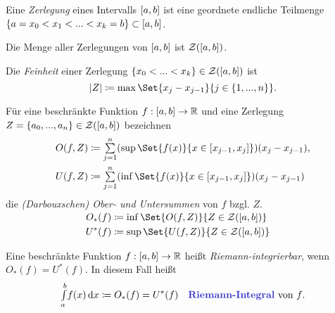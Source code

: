 \documentclass{cheat-sheet}
\theoremstyle{definition}
\begin{document}
\begin{defn}
  Eine \emph{Zerlegung} eines Intervalls $\left[ a, b \right]$ ist eine geordnete endliche Teilmenge $\{ a = x_0 < x_1 < ... < x_k = b\} \subset \left[ a, b \right]$.
\end{defn}

\begin{nota}
  Die Menge aller Zerlegungen von $\left[ a, b \right]$ ist $\mathcal{Z}(\left[ a, b \right])$.
\end{nota}

\begin{defn}
  Die \emph{Feinheit} einer Zerlegung $\{ x_0 < ... < x_k \} \in \mathcal{Z}(\left[ a, b \right])$ ist
  \[ \abs{Z} \coloneqq \max \Set{ x_j - x_{j-1} }{ j \in \{ 1, ..., n \} }. \]
\end{defn}

\begin{defn}
  Für eine beschränkte Funktion $f : \left[ a, b \right] \to \mathbb{R}$ und eine Zerlegung $Z = \{ a_0, ..., a_n \} \in \mathcal{Z}(\left[ a, b \right])$ bezeichnen
  \begin{align*}
    O(f, Z) &\coloneqq \sum_{j=1}^n (\sup \Set{ f(x) }{ x \in [x_{j-1}, x_j] })(x_j - x_{j-1}),\\
    U(f, Z) &\coloneqq \sum_{j=1}^n (\inf \Set{ f(x) }{ x \in [x_{j-1}, x_j] })(x_j - x_{j-1})
  \end{align*}
  die \emph{(Darbouxschen) Ober- und Untersummen} von $f$ bzgl. $Z$.
\end{defn}

\begin{nota}
  \begin{align*}\\[-24pt]
    O_*(f) &\coloneqq \inf \Set{ O(f, Z) }{ Z \in \mathcal{Z}(\cinterval{a}{b}) }\\
    U^*(f) &\coloneqq \sup \Set{ U(f, Z) }{ Z \in \mathcal{Z}(\cinterval{a}{b}) }\\
  \end{align*}
\end{nota}

\begin{defn}
  Eine beschränkte Funktion $f : \left[ a, b \right] \to \mathbb{R}$ heißt \emph{Riemann-integrierbar}, wenn $O_*(f) = U^*(f)$. In diesem Fall heißt
  \[ \Int{a}{b}{f(x)}{x} \coloneqq O_*(f) = U^*(f) \quad \text{\emph{Riemann-Integral} von $f$.} \]
\end{defn}
\end{document}
